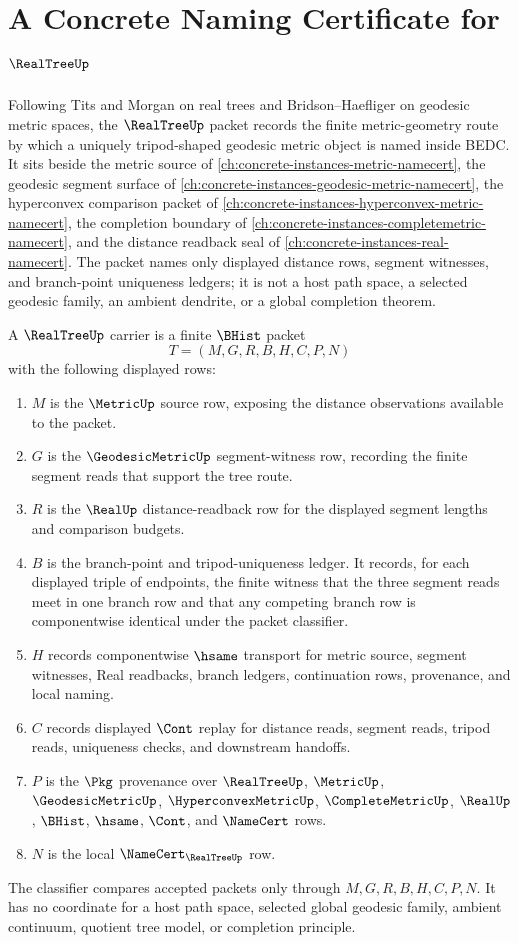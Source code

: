 \chapter{A Concrete Naming Certificate for $\RealTreeUp$}
\label{ch:concrete-instances-real-tree-namecert}

Following Tits and Morgan on real trees and Bridson--Haefliger on geodesic metric spaces, the $\RealTreeUp$ packet records the finite metric-geometry route by which a uniquely tripod-shaped geodesic metric object is named inside BEDC. It sits beside the metric source of \autoref{ch:concrete-instances-metric-namecert}, the geodesic segment surface of \autoref{ch:concrete-instances-geodesic-metric-namecert}, the hyperconvex comparison packet of \autoref{ch:concrete-instances-hyperconvex-metric-namecert}, the completion boundary of \autoref{ch:concrete-instances-completemetric-namecert}, and the distance readback seal of \autoref{ch:concrete-instances-real-namecert}. The packet names only displayed distance rows, segment witnesses, and branch-point uniqueness ledgers; it is not a host path space, a selected geodesic family, an ambient dendrite, or a global completion theorem.

\begin{definition}
\label{def:real-tree-carrier}
A $\RealTreeUp$ carrier is a finite $\BHist$ packet
$$
T=(M,G,R,B,H,C,P,N)
$$
with the following displayed rows:
\begin{enumerate}
\item $M$ is the $\MetricUp$ source row, exposing the distance observations available to the packet.
\item $G$ is the $\GeodesicMetricUp$ segment-witness row, recording the finite segment reads that support the tree route.
\item $R$ is the $\RealUp$ distance-readback row for the displayed segment lengths and comparison budgets.
\item $B$ is the branch-point and tripod-uniqueness ledger. It records, for each displayed triple of endpoints, the finite witness that the three segment reads meet in one branch row and that any competing branch row is componentwise identical under the packet classifier.
\item $H$ records componentwise $\hsame$ transport for metric source, segment witnesses, Real readbacks, branch ledgers, continuation rows, provenance, and local naming.
\item $C$ records displayed $\Cont$ replay for distance reads, segment reads, tripod reads, uniqueness checks, and downstream handoffs.
\item $P$ is the $\Pkg$ provenance over $\RealTreeUp$, $\MetricUp$, $\GeodesicMetricUp$, $\HyperconvexMetricUp$, $\CompleteMetricUp$, $\RealUp$, $\BHist$, $\hsame$, $\Cont$, and $\NameCert$ rows.
\item $N$ is the local $\NameCert_{\RealTreeUp}$ row.
\end{enumerate}
The classifier compares accepted packets only through $M,G,R,B,H,C,P,N$. It has no coordinate for a host path space, selected global geodesic family, ambient continuum, quotient tree model, or completion principle.
\end{definition}


